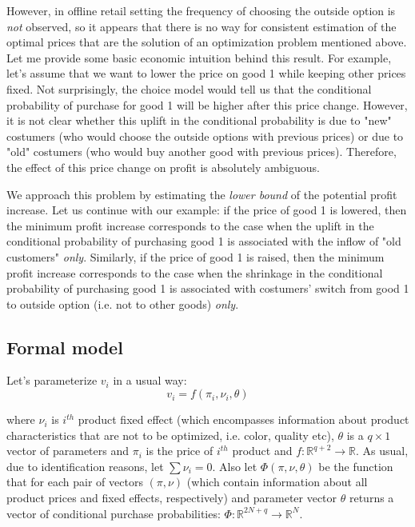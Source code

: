 \documentclass[12pt]{article}
\begin{document}
\par However, in offline retail setting the frequency of choosing the outside option is \textit{not} observed, so it appears that there is no way for consistent estimation of the optimal prices that are the solution of an optimization problem mentioned above.
Let me provide some basic economic intuition behind this result.
For example, let's assume that we want to lower the price on good 1 while keeping other prices fixed.
Not surprisingly, the choice model would tell us that the conditional probability of purchase for good 1 will be higher after this price change.
However, it is not clear whether this uplift in the conditional probability is due to "new" costumers (who would choose the outside options with previous prices) or due to "old" costumers (who would buy another good with previous prices).
Therefore, the effect of this price change on profit is absolutely ambiguous.

\par We approach this problem by estimating the \textit{lower bound} of the potential profit increase.
Let us continue with our example: if the price of good 1 is lowered, then the minimum profit increase corresponds to the case when the uplift in the conditional probability of purchasing good 1 is associated with the inflow of "old customers" \textit{only}.
Similarly, if the price of good 1 is raised, then the minimum profit increase corresponds to the case when the shrinkage in the conditional probability of purchasing good 1 is associated with costumers' switch from good 1 to outside option (i.e. not to other goods) \textit{only}.

\subsection{Formal model}

Let's parameterize $v_i$ in a usual way:
\begin{equation*}
v_i = f(\pi_i,\nu_i,\theta)
\end{equation*} 

where $\nu_i$ is $i^{th}$ product fixed effect (which encompasses information about product characteristics that are not to be optimized, i.e. color, quality etc), $\theta$ is a $q \times 1$ vector of parameters and $\pi_i$ is the price of $i^{th}$ product and $f:\mathbb{R}^{q+2} \rightarrow \mathbb{R}$.
As usual, due to identification reasons, let $\sum \nu_i = 0$.
Also let $\Phi(\pi,\nu, \theta)$ be the function that for each pair of vectors $(\pi,\nu)$ (which contain information about all product prices and fixed effects, respectively) and parameter vector $\theta$ returns a vector of conditional purchase probabilities: $\Phi: \mathbb{R}^{2N+q} \rightarrow \mathbb{R}^N$.
\end{document}
